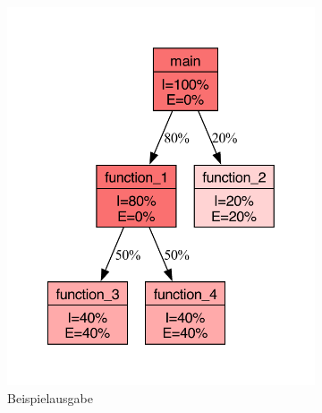 \begin{figure}
    \center
    \begin{subfigure}[b]{0.45\textwidth}
        \includegraphics[width=\textwidth, page=1]{Bilder/pdf/profiler_output_example.pdf}
        \caption{Beispielausgabe}\label{fig:beispielausgabe_hana_profiler}
    \end{subfigure}
    \hfill
    \begin{subfigure}[b]{0.45\textwidth}

\end{subfigure}
\end{figure}
